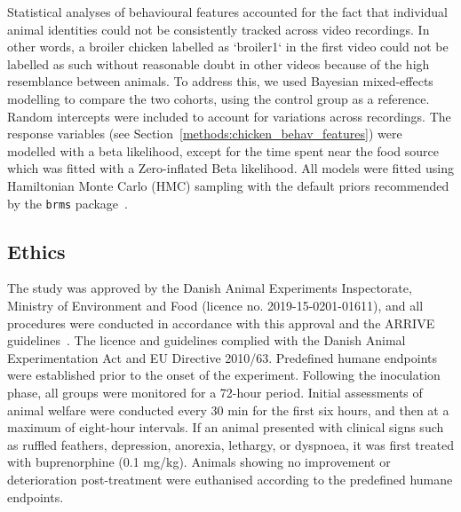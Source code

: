 Statistical analyses of behavioural features accounted for the fact that individual animal identities could not be consistently tracked across video recordings. In other words, a broiler chicken labelled as `broiler1` in the first video could not be labelled as such without reasonable doubt in other videos because of the high resemblance between animals. To address this, we used Bayesian mixed-effects modelling to compare the two cohorts, using the control group as a reference. Random intercepts were included to account for variations across recordings. The response variables (see Section~\ref{methods:chicken_behav_features}) were modelled with a beta likelihood, except for the time spent near the food source which was fitted with a Zero-inflated Beta likelihood. All models were fitted using Hamiltonian Monte Carlo (HMC) sampling with the default priors recommended by the \texttt{brms} package~\cite{burkner2017}. %



\subsection{Ethics}

The study was approved by the Danish Animal Experiments Inspectorate, Ministry of Environment and Food (licence no. 2019-15-0201-01611), and all procedures were conducted in accordance with this approval and the ARRIVE guidelines~\cite{scheidwasser2025c}. The licence and guidelines complied with the Danish Animal Experimentation Act and EU Directive 2010/63. Predefined humane endpoints were established prior to the onset of the experiment. Following the inoculation phase, all groups were monitored for a 72-hour period. Initial assessments of animal welfare were conducted every 30 min for the first six hours, and then at a maximum of eight-hour intervals. If an animal presented with clinical signs such as ruffled feathers, depression, anorexia, lethargy, or dyspnoea, it was first treated with buprenorphine (0.1 mg/kg). Animals showing no improvement or deterioration post-treatment were euthanised according to the predefined humane endpoints.

